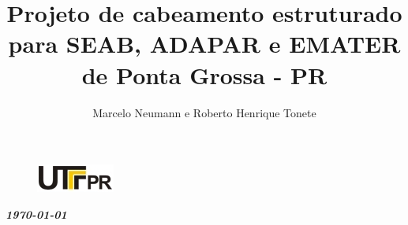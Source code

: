\documentclass[	DIV=calc,%
							paper=a4,%
							fontsize=12pt,%
							onecolumn]{scrartcl}	 					%
\title{Projeto de cabeamento estruturado para SEAB, ADAPAR e EMATER de Ponta Grossa - PR}					%
\author{Marcelo Neumann e Roberto Henrique Tonete }  	%
\date{}																				%
\newcommand{\initial}[1]{%
     \lettrine[lines=3,lhang=0.3,nindent=0em]{
     				\color{DarkGoldenrod}
     				{\textsf{#1}}}{}}
\begin{document}
\maketitle
\thispagestyle{fancy} 	
\thispagestyle{empty}		%


\begin{figure}
	\centering
	\includegraphics{utfpr}
\end{figure}

\vspace{2cm}
\centerline{\textit{\textbf{\today}}}






\end{document}
